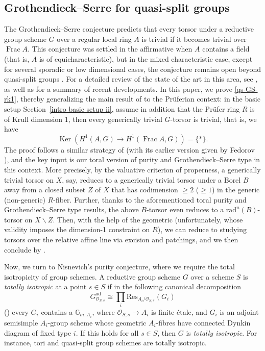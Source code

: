\documentclass[JEP,XML,SOM,Unicode,published]{cedram}
\let\ts\textstyle
\let\backslash\smallsetminus
\newcommand{\bG}{\mathbb{G}}
\newcommand{\sO}{\mathscr{O}}
\DeclareMathOperator{\Ker}{Ker}
\DeclareMathOperator{\Frac}{Frac}
\theoremstyle{plain}
\theoremstyle{definition}
\begin{document}
\subsection{Grothendieck--Serre for quasi-split groups}
The Grothendieck--Serre conjecture predicts that every torsor under a reductive group scheme $G$ over a regular local ring $A$ is trivial if it becomes trivial over $\Frac A$.
This conjecture was settled in the affirmative when $A$ contains a field (that is, $A$ is of equicharacteristic), but in the mixed characteristic case, except for several sporadic or low dimensional cases, the conjecture remains open beyond quasi-split groups \cite{Ces22a}. For a detailed review of the state of the art in this area, see \cite[\S5]{Pan18} , as well as \cite[\S 1.2]{GL23} for a summary of recent developments.
In this paper, we prove \eqref{qs-GS-rk1}, thereby generalizing the main result of \cite{Ces22a} to the Prüferian context: in the basic setup Section~\ref{intro basic setup ii}, assume in addition that the Prüfer ring $R$ is of Krull dimension 1, then every generically trivial $G$-torsor is trivial, that is, we have
\[
\Ker \left(H^1(A,G)\to H^1(\Frac A,G)\right) =\{*\}.
\]
The proof follows a similar strategy of \cite{Ces22a} (with its earlier version given by Fedorov \cite{Fed22b}), and the key input is our toral version of purity  and Grothendieck--Serre type  in this context. More precisely, by the valuative criterion of properness, a generically trivial torsor on $X$, say, reduces to a generically trivial torsor under a Borel $B$ away from a closed subset $Z$ of $X$ that has codimension $\ge 2$ (\resp $\ge 1$) in the generic (\resp non-generic) $R$-fiber. Further, thanks to the aforementioned toral purity and Grothendieck--Serre type results, the above $B$-torsor even reduces to a $\text{rad}^u(B)$-torsor on $X \backslash Z$. Then, with the help of the geometric  (unfortunately, whose validity imposes the dimension-1 constraint on $R$), we can reduce to studying torsors over the relative affine line via excision and patchings, and we then conclude by \cite[Th.\,5.1]{GL23}.

Now, we turn to Nisnevich's purity conjecture, where we require the total isotropicity of group schemes.
A reductive group scheme $G$ over a scheme $S$ is \emph{totally isotropic} at a point $s\in S$ if in the following canonical decomposition
\[
\ts G^{\mathrm{ad}}_{\sO_{S,s}}\cong \prod_i\mathrm{Res}_{A_i/\sO_{S,s}}(G_i)
\]
(\cf \cite[Exp.\,XXIV, Prop.\,5.10(i)]{SGA3IIInew}) every $G_i$
contains a $\bG_{m,A_i}$, where $\sO_{S,s}\to A_i$ is finite étale, and $G_i$ is an adjoint semisimple $A_i$-group scheme whose geometric $A_i$-fibres have connected Dynkin diagram of fixed type $i$.
If this holds for all $s\in S$, then $G$ is \emph{totally isotropic}. For instance, tori and quasi-split group schemes are totally isotropic.
\end{document}
